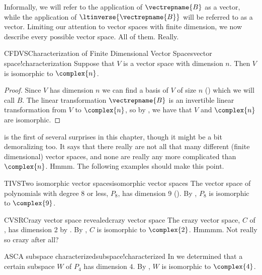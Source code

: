 %
Informally, we will refer to the application of $\vectrepname{B}$ as  a vector, while the application of $\ltinverse{\vectrepname{B}}$ will be referred to as  a vector.
%
%
%
Limiting our attention to vector spaces with finite dimension, we now describe every possible vector space.  All of them.  Really.
%
\begin{theorem}{CFDVS}{Characterization of Finite Dimensional Vector Spaces}{vector space!characterization}
Suppose that $V$ is a vector space with dimension $n$.  Then $V$ is isomorphic to $\complex{n}$.
\end{theorem}
%
\begin{proof}
%
Since $V$ has dimension $n$ we can find a basis of $V$ of size $n$ () which we will call $B$.  The linear transformation $\vectrepname{B}$ is an invertible linear transformation from $V$ to $\complex{n}$, so by , we have that $V$ and $\complex{n}$ are isomorphic.
%
\end{proof}
%
 is the first of several surprises in this chapter, though it might be a bit demoralizing too.  It says that there really are not all that many different (finite dimensional) vector spaces, and none are really any more complicated than $\complex{n}$.  Hmmm.  The following examples should make this point.
%
\begin{example}{TIVS}{Two isomorphic vector spaces}{isomorphic vector spaces}
The vector space of polynomials with degree 8 or less, $P_8$, has dimension 9 ().  By , $P_8$ is isomorphic to $\complex{9}$.
%
\end{example}
%
\begin{example}{CVSR}{Crazy vector space revealed}{crazy vector space}
The crazy vector space, $C$ of , has dimension 2 by .  By , $C$ is isomorphic to $\complex{2}$.  Hmmmm.  Not really so crazy after all?
%
\end{example}
%
%
\begin{example}{ASC}{A subspace characterized}{subspace!characterized}
In  we determined that a certain subspace $W$ of $P_4$ has dimension $4$.  By , $W$ is isomorphic to $\complex{4}$.
%
\end{example}
